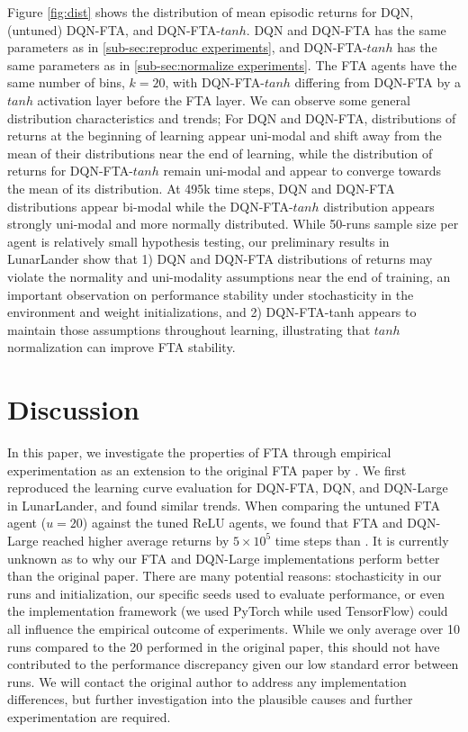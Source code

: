\documentclass{article}
\begin{document}
Figure \ref{fig:dist} shows the distribution of mean episodic returns for DQN, (untuned) DQN-FTA, and DQN-FTA-$tanh$. DQN and DQN-FTA has the same parameters as in \ref{sub-sec:reproduc experiments}, and DQN-FTA-$tanh$ has the same parameters as in \ref{sub-sec:normalize experiments}. The FTA agents have the same number of bins, $k=20$, with DQN-FTA-$tanh$ differing from DQN-FTA by a $tanh$ activation layer before the FTA layer. We can observe some general distribution characteristics and trends; For DQN and DQN-FTA, distributions of returns at the beginning of learning appear uni-modal and shift away from the mean of their distributions near the end of learning, while the distribution of returns for DQN-FTA-$tanh$ remain uni-modal and appear to converge towards the mean of its distribution. At 495k time steps, DQN and DQN-FTA distributions appear bi-modal while the DQN-FTA-$tanh$ distribution appears strongly uni-modal and more normally distributed. While 50-runs sample size per agent is relatively small hypothesis testing, our preliminary results in LunarLander show that 1) DQN and DQN-FTA distributions of returns may violate the normality and uni-modality assumptions near the end of training, an important observation on performance stability under stochasticity in the environment and weight initializations, and 2) DQN-FTA-tanh appears to maintain those assumptions throughout learning, illustrating that $tanh$ normalization can improve FTA stability.



\section{Discussion} \label{sec:discussion}
In this paper, we investigate the properties of FTA through empirical experimentation as an extension to the original FTA paper by \cite[]{pan2019fuzzy}.
We first reproduced the learning curve evaluation for DQN-FTA, DQN, and DQN-Large in LunarLander, and found similar trends. When comparing the untuned FTA agent ($u = 20$) against the tuned ReLU agents, we found that FTA and DQN-Large reached higher average returns by $5\times10^5$ time steps than \cite{pan2019fuzzy}. It is currently unknown as to why our FTA and DQN-Large implementations perform better than the original paper. There are many potential reasons: stochasticity in our runs and initialization, our specific seeds used to evaluate performance, or even the implementation framework (we used PyTorch while \cite{pan2019fuzzy} used TensorFlow) could all influence the empirical outcome of experiments. While we only average over 10 runs compared to the 20 performed in the original paper, this should not have contributed to the performance discrepancy given our low standard error between runs. We will contact the original author to address any implementation differences, but further investigation into the plausible causes and further experimentation are required.
\end{document}

